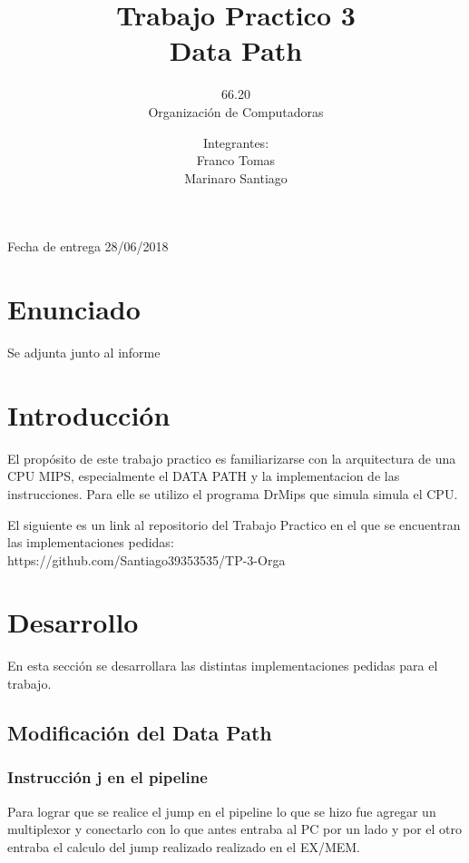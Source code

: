 \textbf{}\documentclass{article}
\title{Trabajo Practico 3\\ Data Path}
\author{66.20\\ Organización de Computadoras}
\date{Integrantes: \\ Franco Tomas \\ Marinaro Santiago}
\begin{document}
\begin{titlepage}
\maketitle
\begin{center}
Fecha de entrega 28/06/2018
\end{center}
\end{titlepage}

\newpage

\section{Enunciado}
Se adjunta junto al informe

\section{Introducción}
El propósito de este trabajo practico es familiarizarse con la arquitectura de una CPU MIPS, especialmente el DATA PATH y la implementacion de las instrucciones. Para elle se utilizo el programa DrMips  que simula simula el CPU.

El siguiente es un link al repositorio del Trabajo Practico en el que se encuentran las implementaciones pedidas:\\
https://github.com/Santiago39353535/TP-3-Orga\\

\section{Desarrollo}
En esta sección se desarrollara las distintas implementaciones pedidas para el trabajo.

\subsection{Modificación del Data Path}

\subsubsection{Instrucción j en el pipeline}
Para lograr que se realice el jump en el pipeline lo que se hizo fue agregar un multiplexor y conectarlo con lo que antes entraba al PC por un lado y por el otro entraba el calculo del jump realizado realizado en el EX/MEM. 
\end{document}
